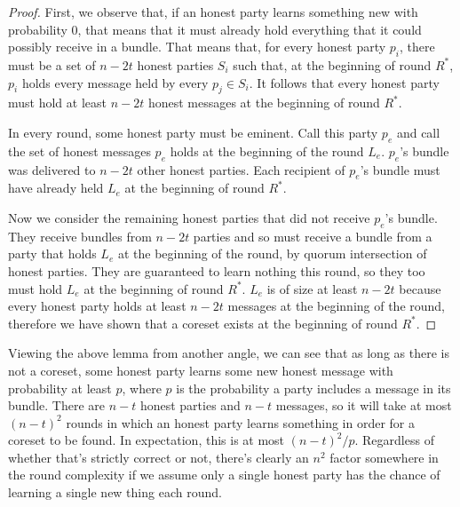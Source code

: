 \documentclass{article}
\begin{document}
\begin{proof}
First, we observe that, if an honest party learns something new with probability 0, that means that it must already hold everything that it could possibly receive in a bundle. That means that, for every honest party $p_i$, there must be a set of $n - 2t$ honest parties $S_i$ such that, at the beginning of round $R^*$, $p_i$ holds every message held by every $p_j \in S_i$. It follows that every honest party must hold at least $n - 2t$ honest messages at the beginning of round $R^*$. 

In every round, some honest party must be eminent. Call this party $p_e$ and call the set of honest messages $p_e$ holds at the beginning of the round $L_e$. $p_e$'s bundle was delivered to $n - 2t$ other honest parties. Each recipient of $p_e$'s bundle must have already held $L_e$ at the beginning of round $R^*$. 

Now we consider the remaining honest parties that did not receive $p_e$'s bundle. They receive bundles from $n - 2t$ parties and so must receive a bundle from a party that holds $L_e$ at the beginning of the round, by quorum intersection of honest parties. They are guaranteed to learn nothing this round, so they too must hold $L_e$ at the beginning of round $R^*$. $L_e$ is of size at least $n - 2t$ because every honest party holds at least $n -2t$ messages at the beginning of the round, therefore we have shown that a coreset exists at the beginning of round $R^*$.
\end{proof}

Viewing the above lemma from another angle, we can see that as long as there is not a coreset, some honest party learns some new honest message with probability at least $p$, where $p$ is the probability a party includes a message in its bundle. There are $n - t$ honest parties and $n - t$ messages, so it will take at most $(n - t)^2$ rounds in which an honest party learns something in order for a coreset to be found. In expectation, this is at most $(n - t)^2 / p$. Regardless of whether that's strictly correct or not, there's clearly an $n^2$ factor somewhere in the round complexity if we assume only a single honest party has the chance of learning a single new thing each round. 



\end{document}
